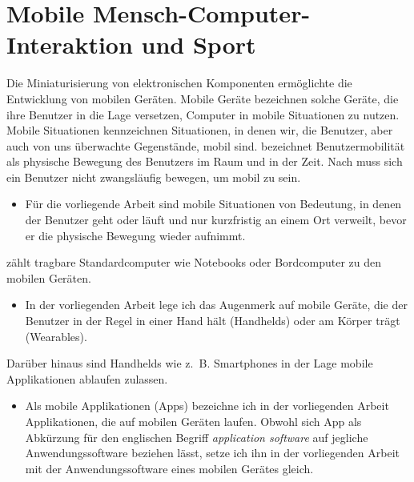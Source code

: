  

\section{Mobile Mensch-Computer-Interaktion und Sport} 

\label{sec:mobile_mensch_computer_interaktion_und_sport}

Die Miniaturisierung von elektronischen Komponenten ermöglichte die Entwicklung von mobilen Geräten. Mobile Geräte bezeichnen solche Geräte, die ihre Benutzer in die Lage versetzen, Computer in mobile Situationen zu nutzen. Mobile Situationen kennzeichnen Situationen, in denen wir, die Benutzer, aber auch von uns überwachte Gegenstände, mobil sind. \citet[][S.~24~ff.]{Cooper2002} bezeichnet Benutzermobilität als physische Bewegung des Benutzers im Raum und in der Zeit. Nach \citet[][S.~7]{Roth2005} muss sich ein Benutzer nicht zwangsläufig bewegen, um mobil zu sein. 
\begin{itemize}
	
	\item Für die vorliegende Arbeit sind mobile Situationen von Bedeutung, in denen der Benutzer geht oder läuft und nur kurzfristig an einem Ort verweilt, bevor er die physische Bewegung wieder aufnimmt.
\end{itemize}

\citet[][S.~5]{Roth2005} zählt tragbare Standardcomputer wie Notebooks oder Bordcomputer zu den mobilen Geräten. 
\begin{itemize}
	
	\item In der vorliegenden Arbeit lege ich das Augenmerk auf mobile Geräte, die der Benutzer in der Regel in einer Hand hält (Handhelds) oder am Körper trägt (Wearables).
\end{itemize}

Darüber hinaus sind Handhelds wie z.~B. Smartphones in der Lage mobile Applikationen ablaufen zulassen. 
\begin{itemize}
	
	\item Als mobile Applikationen (Apps) bezeichne ich in der vorliegenden Arbeit Applikationen, die auf mobilen Geräten laufen. Obwohl sich App als Abkürzung für den englischen Begriff \emph{application software} auf jegliche Anwendungssoftware beziehen lässt, setze ich ihn in der vorliegenden Arbeit mit der Anwendungssoftware eines mobilen Gerätes gleich.
\end{itemize}

